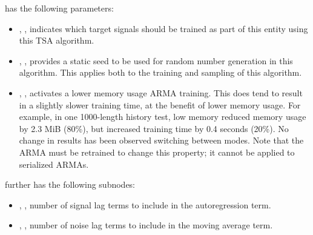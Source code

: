 {\begin{itemize}
     has the following parameters:
    \begin{itemize}
      \item {}, , indicates which
        target signals should be trained as part of this entity using this TSA algorithm.
      \item {}, , provides a static seed to be used for
        random number generation in this algorithm. This applies both to the training and sampling of this
        algorithm.
      \item {}, , activates a lower memory
        usage ARMA training. This does tend to result
        in a slightly slower training time, at the benefit of lower memory usage. For
        example, in one 1000-length history test, low memory reduced memory usage by 2.3
        MiB (80\%), but increased training time by 0.4 seconds (20\%). No change in results has been
        observed switching between modes. Note that the ARMA must be
        retrained to change this property; it cannot be applied to serialized ARMAs.
    \end{itemize}
     further has the following subnodes:
    \begin{itemize}
      \item {}, , number of signal lag terms to
        include in the autoregression term.
      \item {}, , number of noise lag terms to
        include in the moving average term.
    \end{itemize}
\end{itemize}
}
